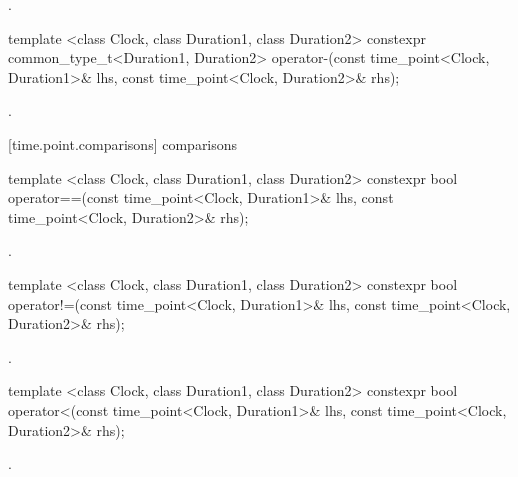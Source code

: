 \begin{itemdescr}
\pnum
\returns {}.
\end{itemdescr}

%
\begin{itemdecl}
template <class Clock, class Duration1, class Duration2>
  constexpr common_type_t<Duration1, Duration2>
  operator-(const time_point<Clock, Duration1>& lhs, const time_point<Clock, Duration2>& rhs);
\end{itemdecl}

\begin{itemdescr}
\pnum
\returns {}.
\end{itemdescr}

[time.point.comparisons]{ comparisons}

%
\begin{itemdecl}
template <class Clock, class Duration1, class Duration2>
  constexpr bool operator==(const time_point<Clock, Duration1>& lhs, const time_point<Clock, Duration2>& rhs);
\end{itemdecl}

\begin{itemdescr}
\pnum
\returns {}.
\end{itemdescr}

%
\begin{itemdecl}
template <class Clock, class Duration1, class Duration2>
  constexpr bool operator!=(const time_point<Clock, Duration1>& lhs, const time_point<Clock, Duration2>& rhs);
\end{itemdecl}

\begin{itemdescr}
\pnum
\returns {}.
\end{itemdescr}

%
\begin{itemdecl}
template <class Clock, class Duration1, class Duration2>
  constexpr bool operator<(const time_point<Clock, Duration1>& lhs, const time_point<Clock, Duration2>& rhs);
\end{itemdecl}

\begin{itemdescr}
\pnum
\returns {}.
\end{itemdescr}


